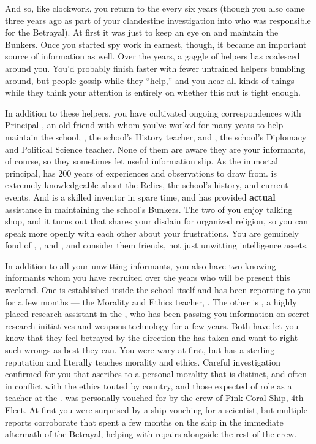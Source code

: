 \documentclass[char]{GL2020}
\begin{document}
And so, like clockwork, you return to the \pSchool{} every six years (though you also came three years ago as part of your clandestine investigation into who was responsible for the Betrayal). At first it was just to keep an eye on and maintain the Bunkers. Once you started spy work in earnest, though, it became an important source of information as well. Over the years, a gaggle of helpers has coalesced around you. You'd probably finish faster with fewer untrained helpers bumbling around, but people gossip while they ``help,'' and you hear all kinds of things while they think your attention is entirely on whether this nut is tight enough. 

In addition to these helpers, you have cultivated ongoing correspondences with Principal \cPrincipal{\intro}, an old friend with whom you've worked for many years to help maintain the school, \cHistory{\intro}, the school's History teacher, and \cChupInventor{\intro}, the school’s Diplomacy and Political Science teacher. None of them are aware they are your informants, of course, so they sometimes let useful information slip. As the immortal principal, \cPrincipal{} has 200 years of experiences and observations to draw from. \cHistory{} is extremely knowledgeable about the Relics, the school's history, and current events. And \cChupInventor{} is a skilled inventor in \cChupInventor{\their} spare time, and has provided \textbf{actual} assistance in maintaining the school’s Bunkers. The two of you enjoy talking shop, and it turns out that \cChupInventor{} shares your disdain for organized religion, so you can speak more openly with each other about your frustrations. You are genuinely fond of \cPrincipal{}, \cHistory{}, and \cChupInventor{}, and consider them friends, not just unwitting intelligence assets. 

In addition to all your unwitting informants, you also have two knowing informants whom you have recruited over the years who will be present this weekend. One is established inside the school itself and has been reporting to you for a few months — the Morality and Ethics teacher, \cEthics{\intro}. The other is \cAssistantScientist{\intro}, a highly placed research assistant in the \pTech{}, who has been passing you information on secret research initiatives and weapons technology for a few years. Both have let you know that they feel betrayed by the direction the \pTech{} has taken and want to right such wrongs as best they can. You were wary at first, but \cEthics{} has a sterling reputation and literally teaches morality and ethics. Careful investigation confirmed for you that \cEthics{} ascribes to a personal morality that is distinct, and often in conflict with the ethics touted by \cEthics{\their} country, and those expected of \cEthics{\their} role as a teacher at the \pSc{}. \cAssistantScientist{} was personally vouched for by the crew of Pink Coral Ship, 4th Fleet. At first you were surprised by a \pShippie{} ship vouching for a \pTech{} scientist, but multiple reports corroborate that \cAssistantScientist{\they} spent a few months on the ship in the immediate aftermath of the Betrayal, helping with repairs alongside the rest of the crew.
\end{document}
